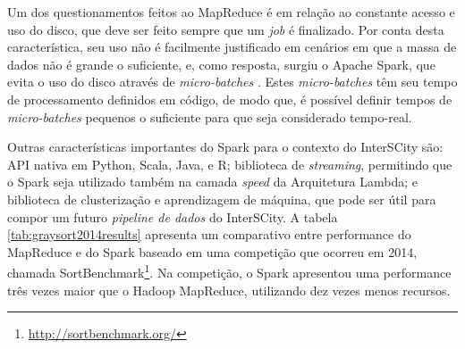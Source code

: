 Um dos questionamentos feitos ao MapReduce é em relação ao constante acesso e
uso do disco, que deve ser feito sempre que um \textit{job} é finalizado. Por
conta desta característica, seu uso não é facilmente justificado em cenários em
que a massa de dados não é grande o suficiente, e, como resposta, surgiu o
Apache Spark, que evita o uso do disco através de \textit{micro-batches}
\cite{arsalan2014}. Estes \textit{micro-batches} têm seu tempo de processamento
definidos em código, de modo que, é possível definir tempos de
\textit{micro-batches} pequenos o suficiente para que seja considerado
tempo-real.

Outras características importantes do Spark para o contexto do
InterSCity são: API nativa em Python, Scala, Java, e R; biblioteca de
\textit{streaming}, permitindo que o Spark seja utilizado também na camada
\textit{speed} da Arquitetura Lambda; e biblioteca de clusterização e
aprendizagem de máquina, que pode ser útil para compor um futuro \textit{pipeline
de dados} do InterSCity. A tabela \ref{tab:graysort2014results} apresenta
um comparativo entre performance do MapReduce e do Spark baseado em uma
competição que ocorreu em 2014, chamada
SortBenchmark\footnote{\url{http://sortbenchmark.org/}}. Na competição, o Spark
apresentou uma performance três vezes maior que o Hadoop MapReduce, utilizando
dez vezes menos recursos.


